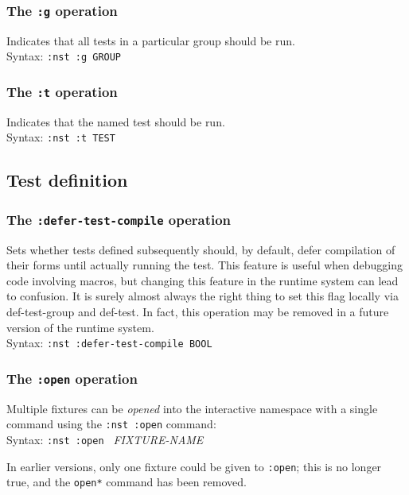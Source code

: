 \subsubsection{The \texttt{:g} operation}
%
Indicates that all tests in a particular group should be run.
\\ Syntax: \texttt{:nst :g GROUP}

\subsubsection{The \texttt{:t} operation}
%
Indicates that the named test should be run.
\\ Syntax: \texttt{:nst :t TEST}

\subsection{Test definition}
\subsubsection{The \texttt{:defer-test-compile} operation}
%
Sets whether tests defined subsequently should, by default, defer
compilation of their forms until actually running the test.  This
feature is useful when debugging code involving macros, but changing
this feature in the runtime system can lead to confusion.  It is
surely almost always the right thing to set this flag locally via
def-test-group and def-test.  In fact, this operation may be removed
in a future version of the runtime system.
\\ Syntax: \texttt{:nst :defer-test-compile BOOL}

\subsubsection{The \texttt{:open{\textasteriskcentered}} operation}
%
Multiple fixtures can be \emph{opened} into the
interactive namespace with a single command using the
\texttt{:nst~:open} command:
\\ Syntax: \texttt{:nst :open\* } {\textit{FIXTURE-NAME}{\textasteriskcentered}}
\par
In earlier versions, only one fixture could be given to
\texttt{:open}; this is no longer true, and the \texttt{open*} command
has been removed.

